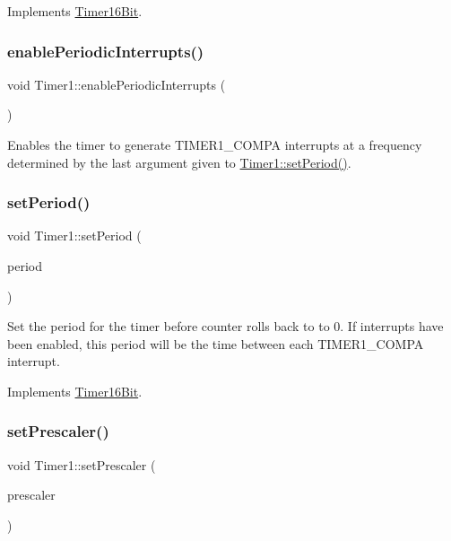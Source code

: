 Implements \mbox{\hyperlink{class_timer16_bit}{Timer16\+Bit}}.

\mbox{\label{class_timer1_adffa570f7391a22de1f6ae1673cd2861}} 
\subsubsection{\texorpdfstring{enable\+Periodic\+Interrupts()}{enablePeriodicInterrupts()}}
{\footnotesize\ttfamily void Timer1\+::enable\+Periodic\+Interrupts (\begin{DoxyParamCaption}{ }\end{DoxyParamCaption})}

Enables the timer to generate T\+I\+M\+E\+R1\+\_\+\+C\+O\+M\+PA interrupts at a frequency determined by the last argument given to \mbox{\hyperlink{class_timer1_a0aa1eeb582f2a3360f2cb53678c726f9}{Timer1\+::set\+Period()}}. \mbox{\label{class_timer1_a0aa1eeb582f2a3360f2cb53678c726f9}} 
\subsubsection{\texorpdfstring{set\+Period()}{setPeriod()}}
{\footnotesize\ttfamily void Timer1\+::set\+Period (\begin{DoxyParamCaption}\item[{u16}]{period }\end{DoxyParamCaption})\hspace{0.3cm}{\ttfamily [virtual]}}

Set the period for the timer before counter rolls back to to 0. If interrupts have been enabled, this period will be the time between each T\+I\+M\+E\+R1\+\_\+\+C\+O\+M\+PA interrupt. 

Implements \mbox{\hyperlink{class_timer16_bit}{Timer16\+Bit}}.

\mbox{\label{class_timer1_a4e841a09f12c8de397440cf6cd74fa4b}} 
\subsubsection{\texorpdfstring{set\+Prescaler()}{setPrescaler()}}
{\footnotesize\ttfamily void Timer1\+::set\+Prescaler (\begin{DoxyParamCaption}\item[{Prescale\+Option}]{prescaler }\end{DoxyParamCaption})\hspace{0.3cm}{\ttfamily [virtual]}}

